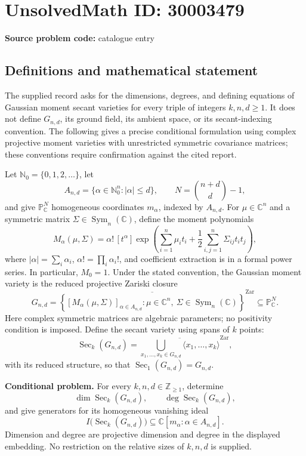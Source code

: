 \documentclass[11pt]{article}
\begin{document}
\section*{UnsolvedMath ID: 30003479}
\textbf{Source problem code:} catalogue entry
\subsection{Definitions and mathematical statement}
The supplied record asks for the dimensions, degrees, and defining equations of Gaussian moment secant varieties for every triple of integers \(k,n,d\geq 1\). It does not define \(G_{n,d}\), its ground field, its ambient space, or its secant-indexing convention. The following gives a precise conditional formulation using complex projective moment varieties with unrestricted symmetric covariance matrices; these conventions require confirmation against the cited report.

Let \(\mathbb N_0=\{0,1,2,\ldots\}\), let
\[
 A_{n,d}=\{\alpha\in\mathbb N_0^n:|\alpha|\leq d\},\qquad N=\binom{n+d}{d}-1,
\]
and give \(\mathbb P^N_{\mathbb C}\) homogeneous coordinates \(m_\alpha\), indexed by \(A_{n,d}\). For \(\mu\in\mathbb C^n\) and a symmetric matrix \(\Sigma\in\operatorname{Sym}_n(\mathbb C)\), define the moment polynomials
\[
 M_\alpha(\mu,\Sigma)=\alpha!\,[t^\alpha]\exp\!\left(\sum_{i=1}^n\mu_i t_i+\frac12\sum_{i,j=1}^n\Sigma_{ij}t_it_j\right),
\]
where \(|\alpha|=\sum_i\alpha_i\), \(\alpha!=\prod_i\alpha_i!\), and coefficient extraction is in a formal power series. In particular, \(M_0=1\). Under the stated convention, the Gaussian moment variety is the reduced projective Zariski closure
\[
 G_{n,d}=\overline{\left\{[M_\alpha(\mu,\Sigma)]_{\alpha\in A_{n,d}}:\mu\in\mathbb C^n,\ \Sigma\in\operatorname{Sym}_n(\mathbb C)\right\}}^{\mathrm{Zar}}\subseteq\mathbb P^N_{\mathbb C}.
\]
Here complex symmetric matrices are algebraic parameters; no positivity condition is imposed. Define the secant variety using spans of \(k\) points:
\[
 \operatorname{Sec}_k(G_{n,d})=\overline{\bigcup_{x_1,\ldots,x_k\in G_{n,d}}\langle x_1,\ldots,x_k\rangle}^{\mathrm{Zar}},
\]
with its reduced structure, so that \(\operatorname{Sec}_1(G_{n,d})=G_{n,d}\).

\textbf{Conditional problem.} For every \(k,n,d\in\mathbb Z_{\geq1}\), determine
\[
 \dim\operatorname{Sec}_k(G_{n,d}),\qquad \deg\operatorname{Sec}_k(G_{n,d}),
\]
and give generators for its homogeneous vanishing ideal
\[
 I\bigl(\operatorname{Sec}_k(G_{n,d})\bigr)\subseteq\mathbb C[m_\alpha:\alpha\in A_{n,d}].
\]
Dimension and degree are projective dimension and degree in the displayed embedding. No restriction on the relative sizes of \(k,n,d\) is supplied.
\end{document}
